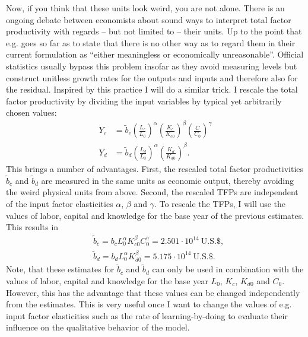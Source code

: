 Now, if you think that these units look weird, you are not alone. There is an ongoing debate between economists about sound ways to interpret total factor productivity with regards -- but not limited to -- their units. Up to the point that e.g. \cite{Barnett2007} goes so far as to state that there is no other way as to regard them in their current formulation as ``either meaningless or economically unreasonable''. Official statistics usually bypass this problem insofar as they avoid measuring levels but construct unitless growth rates for the outputs and inputs and therefore also for the residual. Inspired by this practice I will do a similar trick. I rescale the total factor productivity by dividing the input variables by typical yet arbitrarily chosen values:
\begin{align}
  Y_c &= \tilde{b}_c \left( \frac{L_c}{L_0} \right)^{\alpha} \left( \frac{K_c}{K_{c0}} \right)^{\beta} \left( \frac{C}{C_0} \right)^{\gamma} \label{eq:rescalled_TFP_clean} \\
  Y_d &= \tilde{b}_d \left( \frac{L_d}{L_0} \right)^{\alpha} \left( \frac{K_d}{K_{d0}} \right)^{\beta}. \label{eq:rescalled_TFP_dirty}
\end{align}
This brings a number of advantages. First, the rescaled total factor productivities $\tilde{b}_c$ and $\tilde{b}_d$ are measured in the same units as economic output, thereby avoiding the weird physical units from above. Second, the rescaled TFPs are independent of the input factor elasticities $\alpha$, $\beta$ and $\gamma$.
To rescale the TFPs, I will use the values of labor, capital and knowledge for the base year of the previous estimates. This results in
\begin{align} 
  &\tilde{b}_c = b_c L_0^{\alpha}K_{c0}^\beta C_0^{\gamma} = 2.501 \cdot 10^{14} ~ \mathrm{U.S. \$}, \\
  &\tilde{b}_d = b_d L_0^{\alpha}K_{d0}^\beta =              5.175 \cdot 10^{14} ~ \mathrm{U.S. \$}.
  \label{eq:rescalled_TFP_values}
\end{align}
Note, that these estimates for $\tilde{b}_c$ and $\tilde{b}_d$ can only be used in combination with the values of labor, capital and knowledge for the base year $L_0$, $K_{c}$, $K_{d0}$ and $C_0$. However, this has the advantage that these values can be changed independently from the estimates. This is very useful once I want to change the values of e.g. input factor elasticities such as the rate of learning-by-doing to evaluate their influence on the qualitative behavior of the model.\\

